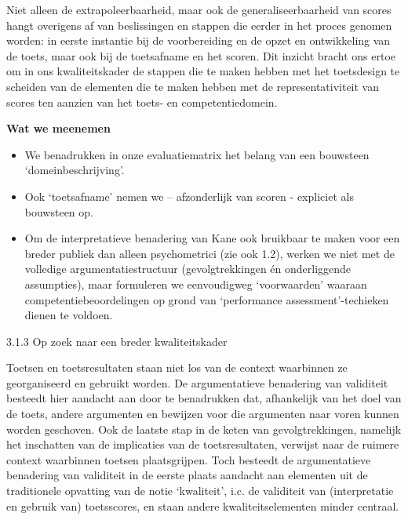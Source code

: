\documentclass[
  letterpaper,
]{report}
\begin{document}
Niet alleen de extrapoleerbaarheid, maar ook de generaliseerbaarheid van
scores hangt overigens af van beslissingen en stappen die eerder in het
proces genomen worden: in eerste instantie bij de voorbereiding en de
opzet en ontwikkeling van de toets, maar ook bij de toetsafname en het
scoren. Dit inzicht bracht ons ertoe om in ons kwaliteitskader de
stappen die te maken hebben met het toetsdesign te scheiden van de
elementen die te maken hebben met de representativiteit van scores ten
aanzien van het toets- en competentiedomein.

\leavevmode{}%
\textbf{Wat we meenemen}

\begin{itemize}
\item
  We benadrukken in onze evaluatiematrix het belang van een bouwsteen
  `domeinbeschrijving'.
\item
  Ook `toetsafname' nemen we -- afzonderlijk van scoren - expliciet als
  bouwsteen op.
\item
  Om de interpretatieve benadering van Kane ook bruikbaar te maken voor
  een breder publiek dan alleen psychometrici (zie ook 1.2), werken we
  niet met de volledige argumentatiestructuur (gevolgtrekkingen én
  onderliggende assumpties), maar formuleren we eenvoudigweg
  `voorwaarden' waaraan competentiebeoordelingen op grond van
  `performance assessment'-techieken dienen te voldoen.
\end{itemize}

3.1.3 Op zoek naar een breder kwaliteitskader

Toetsen en toetsresultaten staan niet los van de context waarbinnen ze
georganiseerd en gebruikt worden. De argumentatieve benadering van
validiteit besteedt hier aandacht aan door te benadrukken dat,
afhankelijk van het doel van de toets, andere argumenten en bewijzen
voor die argumenten naar voren kunnen worden geschoven. Ook de laatste
stap in de keten van gevolgtrekkingen, namelijk het inschatten van de
implicaties van de toetsresultaten, verwijst naar de ruimere context
waarbinnen toetsen plaatsgrijpen. Toch besteedt de argumentatieve
benadering van validiteit in de eerste plaats aandacht aan elementen uit
de traditionele opvatting van de notie `kwaliteit', i.c. de validiteit
van (interpretatie en gebruik van) toetsscores, en staan andere
kwaliteitselementen minder centraal.
\end{document}
